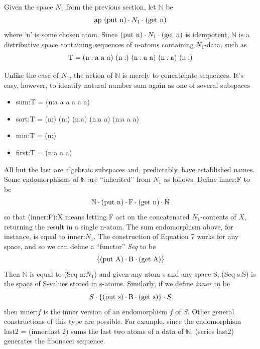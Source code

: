 \documentclass[11pt]{article}
\begin{document}
      Given the space $N_1$ from the previous section, let $\mathbb{N}$ be 
\begin{equation}
{{\rm ap}\ ({\rm put\ {\rm n}})\cdot N_1 \cdot ({\rm get\ {\rm n}})}
\end{equation}
where `n' is some chosen atom.  Since $({\rm put\ n})\cdot N_1 \cdot ({\rm get\ n})$ is idempotent, ${\mathbb N}$ is a distributive space containing 
sequences of $n$-atoms containing $N_1$-data, such as 
\begin{equation} 
{\rm T = (n:a\ a\ a)\ (n:)\ (n:a\ a)\ (n:a)\ (n:)}
\end{equation} 

Unlike the case of $N_1$, the action of ${\mathbb N}$ is merely to concatenate sequences.  It's easy, however, to identify 
natural number sum again as one of several subspaces 
\begin{itemize}
\item sum:T = (n:a a a a a a)
\item sort:T = (n:) (n:) (n:a) (n:a a) (n:a a a)
\item min:T = (n:)
\item first:T = (n:a a a)
\end{itemize} 
All but the last are algebraic subspaces and, predictably, have established names.  
Some endomorphisms of ${\mathbb N}$ are ``inherited'' from $N_1$ as follows.  Define inner:F to be 
\begin{equation}
{\mathbb N}\cdot({\rm put\ n})\cdot {\rm F}\cdot({\rm get\ n})\cdot{\mathbb N}
\end{equation}
so that (inner:F):X means letting F act on the concatenated $N_1$-contents of $X$, returning the result in a single n-atom.  The sum endomorphism 
above, for instance, is equal to inner:$N_1$.  The construction of Equation 7 works for any space, and so we can define a ``functor'' {\it Seq} to be 
\begin{equation}
\{({\rm put}\ {\rm A})\cdot {\rm B} \cdot ({\rm get}\ {\rm A})\}
\end{equation}
Then {$\mathbb N$} is equal to (Seq n:$N_1$) and given any atom s and any space S, (Seq s:S) is the space of S-values stored in s-atoms.  
Similarly, if we define {\it inner} to be  
\begin{equation}
S\cdot\{({\rm put\ s})\cdot{\rm B}\cdot({\rm get\ s})\}\cdot S
\end{equation}
then inner:$f$ is the inner version of an endomorphism $f$ of $S$.  Other general constructions of this type are possible.  For example, 
since the endomorphism last2 = (inner:last 2) sums the last two atoms of a data of ${\mathbb N}$, (series last2) generates the fibonacci sequence. 
\end{document}
